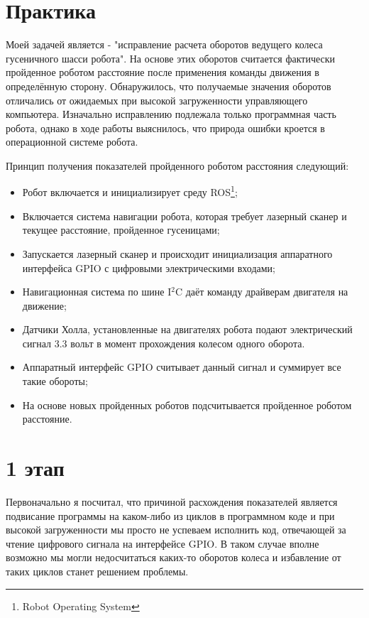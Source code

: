 \documentclass[12pt,a4paper]{scrartcl}
\begin{document}
		\section*{Практика}
			Моей задачей является - "исправление расчета оборотов ведущего колеса гусеничного шасси робота". На основе этих оборотов считается фактически пройденное роботом расстояние после применения команды движения в определённую сторону. Обнаружилось, что получаемые значения оборотов отличались от ожидаемых при высокой загруженности управляющего компьютера. Изначально исправлению подлежала только программная часть робота, однако в ходе работы выяснилось, что природа ошибки кроется в операционной системе робота. 
			
			Принцип получения показателей пройденного роботом расстояния следующий:
			\begin{itemize}
				\item Робот включается и инициализирует среду ROS\footnote{Robot Operating System};
				\item Включается система навигации робота, которая требует лазерный сканер и текущее расстояние, пройденное гусеницами;
				\item Запускается лазерный сканер и происходит инициализация аппаратного интерфейса GPIO с цифровыми электрическими входами;
				\item Навигационная система по шине I$^2$C даёт команду драйверам двигателя на движение;
				\item Датчики Холла, установленные на двигателях робота подают электрический сигнал 3.3 вольт в момент прохождения колесом одного оборота.
				\item Аппаратный интерфейс GPIO считывает данный сигнал и суммирует все такие обороты;
				\item На основе новых пройденных роботов подсчитывается пройденное роботом расстояние.
			\end{itemize}
			
		\section*{1 этап}
			Первоначально я посчитал, что причиной расхождения показателей является подвисание программы на каком-либо из циклов в программном коде и при высокой загруженности мы просто не успеваем исполнить код, отвечающей за чтение цифрового сигнала на интерфейсе GPIO. В таком случае вполне возможно мы могли недосчитаться каких-то оборотов колеса и избавление от таких циклов станет решением проблемы.
			
\end{document}
